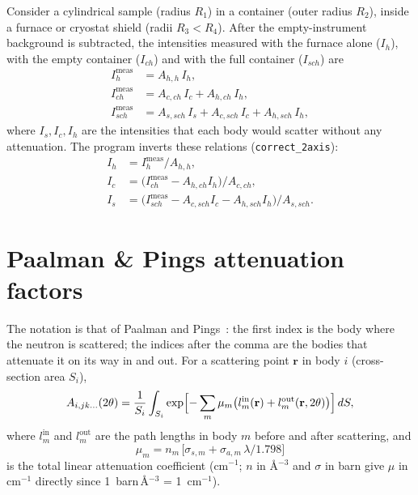 \documentclass[11pt,a4paper]{report}
\newcommand{\code}[1]{\texttt{#1}}
\begin{document}
Consider a cylindrical sample (radius $R_1$) in a container (outer radius
$R_2$), inside a furnace or cryostat shield (radii $R_3 < R_4$). After the
empty-instrument background is subtracted, the intensities measured with the
furnace alone ($I_h$), with the empty container ($I_{ch}$) and with the full
container ($I_{sch}$) are
\begin{align}
  I^{\text{meas}}_{h}   &= A_{h,h}\, I_h, \\
  I^{\text{meas}}_{ch}  &= A_{c,ch}\, I_c + A_{h,ch}\, I_h, \\
  I^{\text{meas}}_{sch} &= A_{s,sch}\, I_s + A_{c,sch}\, I_c + A_{h,sch}\, I_h ,
\end{align}
where $I_s, I_c, I_h$ are the intensities that each body would scatter
without any attenuation. The program inverts these relations
(\code{correct\_2axis}):
\begin{align}
  I_h &= I^{\text{meas}}_{h} / A_{h,h}, \\
  I_c &= \bigl(I^{\text{meas}}_{ch} - A_{h,ch} I_h\bigr) / A_{c,ch}, \\
  I_s &= \bigl(I^{\text{meas}}_{sch} - A_{c,sch} I_c - A_{h,sch} I_h\bigr) / A_{s,sch}.
\end{align}

\section{Paalman \& Pings attenuation factors}

The notation is that of Paalman and Pings~\cite{pp}: the first index is the body
where the neutron is scattered; the indices after the comma are the bodies that
attenuate it on its way in and out. For a scattering point $\mathbf r$ in body
$i$ (cross-section area $S_i$),
\begin{equation}
  A_{i,jk\ldots}(2\theta) = \frac{1}{S_i}\int_{S_i}
  \exp\Bigl[-\sum_{m} \mu_m \bigl(l^{\text{in}}_m(\mathbf r) + l^{\text{out}}_m(\mathbf r, 2\theta)\bigr)\Bigr]
  \,dS ,
\end{equation}
where $l^{\text{in}}_m$ and $l^{\text{out}}_m$ are the path lengths in body $m$
before and after scattering, and
\begin{equation}
  \mu_m = n_m\,\bigl[\sigma_{s,m} + \sigma_{a,m}\,\lambda/1.798\bigr]
\end{equation}
is the total linear attenuation coefficient (cm$^{-1}$; $n$ in \AA$^{-3}$ and
$\sigma$ in barn give $\mu$ in cm$^{-1}$ directly since 1~barn\,\AA$^{-3}$ = 1~cm$^{-1}$).
\end{document}
